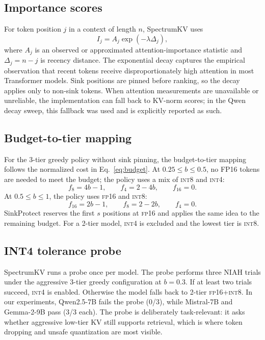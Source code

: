 \documentclass[11pt]{article}
\newcommand{\method}{SpectrumKV}
\newcommand{\niah}{NIAH}
\newcommand{\budget}{b}
\newcommand{\fp}{\textsc{fp16}}
\newcommand{\intviii}{\textsc{int8}}
\newcommand{\intiv}{\textsc{int4}}
\theoremstyle{plain}
\theoremstyle{definition}
\begin{document}
\subsection{Importance scores}
For token position $j$ in a context of length $n$, \method{} uses
\begin{equation}
  I_j = A_j \exp(-\lambda \Delta_j),
  \label{eq:importance}
\end{equation}
where $A_j$ is an observed or approximated attention-importance statistic and $\Delta_j=n-j$ is recency distance.  The exponential decay captures the empirical observation that recent tokens receive disproportionately high attention in most Transformer models.  Sink positions are pinned before ranking, so the decay applies only to non-sink tokens.  When attention measurements are unavailable or unreliable, the implementation can fall back to KV-norm scores; in the Qwen decay sweep, this fallback was used and is explicitly reported as such.

\subsection{Budget-to-tier mapping}
For the 3-tier greedy policy without sink pinning, the budget-to-tier mapping follows the normalized cost in Eq.~\eqref{eq:budget}.  At $0.25\le \budget\le 0.5$, no FP16 tokens are needed to meet the budget; the policy uses a mix of \intviii{} and \intiv{}:
\begin{equation}
  f_8 = 4\budget-1,
  \qquad
  f_4 = 2-4\budget,
  \qquad
  f_{16}=0.
\end{equation}
At $0.5\le \budget\le 1$, the policy uses \fp{} and \intviii{}:
\begin{equation}
  f_{16}=2\budget-1,
  \qquad
  f_8=2-2\budget,
  \qquad
  f_4=0.
\end{equation}
SinkProtect reserves the first $s$ positions at \fp{} and applies the same idea to the remaining budget.  For a 2-tier model, \intiv{} is excluded and the lowest tier is \intviii{}.

\subsection{INT4 tolerance probe}
\method{} runs a probe once per model.  The probe performs three \niah{} trials under the aggressive 3-tier greedy configuration at $\budget=0.3$.  If at least two trials succeed, \intiv{} is enabled.  Otherwise the model falls back to 2-tier \fp{}+\intviii{}.  In our experiments, Qwen2.5-7B fails the probe (0/3), while Mistral-7B and Gemma-2-9B pass (3/3 each).  The probe is deliberately task-relevant: it asks whether aggressive low-tier KV still supports retrieval, which is where token dropping and unsafe quantization are most visible.
\end{document}
